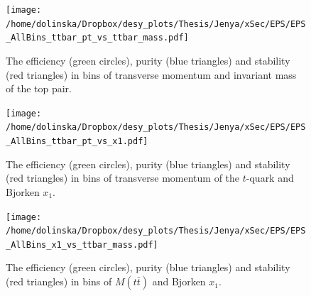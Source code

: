 \begin{figure}[p]
  \centering
  \texttt{[image: /home/dolinska/Dropbox/desy\_plots/Thesis/Jenya/xSec/EPS/EPS\_AllBins\_ttbar\_pt\_vs\_ttbar\_mass.pdf]}
  \caption{The efficiency (green circles), purity (blue triangles) and stability (red triangles) in bins of transverse momentum and invariant mass of the top pair.}
  \label{fig:EPS_2D_pttt_Mtt}
\end{figure}

\begin{figure}[p]
  \centering
  \texttt{[image: /home/dolinska/Dropbox/desy\_plots/Thesis/Jenya/xSec/EPS/EPS\_AllBins\_ttbar\_pt\_vs\_x1.pdf]}
  \caption{The efficiency (green circles), purity (blue triangles) and stability (red triangles) in bins of transverse momentum of the $t$-quark and Bjorken $x_{1}$.}
  \label{fig:EPS_2D_ptt_x1}
\end{figure}

\begin{figure}[p]
  \centering
  \texttt{[image: /home/dolinska/Dropbox/desy\_plots/Thesis/Jenya/xSec/EPS/EPS\_AllBins\_x1\_vs\_ttbar\_mass.pdf]}
  \caption{The efficiency (green circles), purity (blue triangles) and stability (red triangles) in bins of $M(t\bar{t})$ and Bjorken $x_{1}$.}
  \label{fig:EPS_2D_Mtt_x1}
\end{figure}



